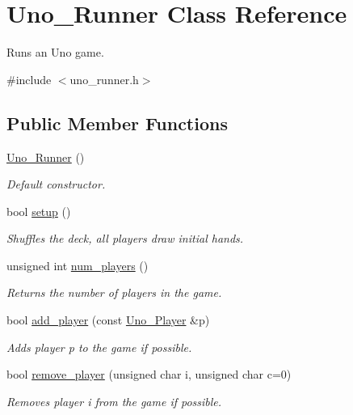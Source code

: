 \hypertarget{class_uno___runner}{
\section{\-Uno\-\_\-\-Runner \-Class \-Reference}
\label{class_uno___runner}
}


\-Runs an \-Uno game.  




{\ttfamily \#include $<$uno\-\_\-runner.\-h$>$}

\subsection*{\-Public \-Member \-Functions}
\begin{DoxyCompactItemize}
\item 
\hyperlink{class_uno___runner_a485bf9506331363e4b0d6208ee446497}{\-Uno\-\_\-\-Runner} ()
\begin{DoxyCompactList}\small\item\em \-Default constructor. \end{DoxyCompactList}\item 
bool \hyperlink{class_uno___runner_ae015517f7d4493ddbaaeacd98be0b9b8}{setup} ()
\begin{DoxyCompactList}\small\item\em \-Shuffles the deck, all players draw initial hands. \end{DoxyCompactList}\item 
unsigned int \hyperlink{class_uno___runner_aa3f43b6ab9042ff74a34ad3fae8a0b11}{num\-\_\-players} ()
\begin{DoxyCompactList}\small\item\em \-Returns the number of players in the game. \end{DoxyCompactList}\item 
bool \hyperlink{class_uno___runner_a982f614c5afa8faa57aedc3116f3d237}{add\-\_\-player} (const \hyperlink{class_uno___player}{\-Uno\-\_\-\-Player} \&p)
\begin{DoxyCompactList}\small\item\em \-Adds player p to the game if possible. \end{DoxyCompactList}\item 
bool \hyperlink{class_uno___runner_acae1277934b338e4c6edd8d45eea5a3e}{remove\-\_\-player} (unsigned char i, unsigned char c=0)
\begin{DoxyCompactList}\small\item\em \-Removes player i from the game if possible. \end{DoxyCompactList}\item 

\end{DoxyCompactItemize}
